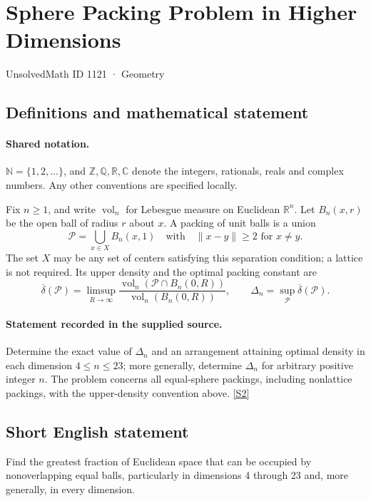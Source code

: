 \documentclass[11pt]{article}
\newcommand{\sref}[2]{\hyperlink{source:#1:#2}{[S#2]}}
\begin{document}
\setcounter{section}{1120}
\section{Sphere Packing Problem in Higher Dimensions}\label{1121}
{\small\sffamily UnsolvedMath ID 1121 · Geometry}
\subsection{Definitions and mathematical statement}

\paragraph{Shared notation.}$\mathbb N=\{1,2,\ldots\}$, and $\mathbb Z,\mathbb Q,\mathbb R,\mathbb C$ denote the integers, rationals, reals and complex numbers. Any other conventions are specified locally.


Fix \(n\ge1\), and write \(\operatorname{vol}_n\) for Lebesgue
measure on Euclidean \(\mathbb R^n\).  Let \(B_n(x,r)\) be the open ball
of radius \(r\) about \(x\).  A packing of unit balls is a union
\[
 \mathcal P=\bigcup_{x\in X}B_n(x,1)
 \quad\text{with}\quad \|x-y\|\ge2\text{ for }x\ne y.
\]
The set \(X\) may be any set of centers satisfying this separation
condition; a lattice is not required.  Its upper density and the
optimal packing constant are
\[
 \overline\delta(\mathcal P)
  =\limsup_{R\to\infty}
    \frac{\operatorname{vol}_n(\mathcal P\cap B_n(0,R))}
         {\operatorname{vol}_n(B_n(0,R))},
 \qquad
 \Delta_n=\sup_{\mathcal P}\overline\delta(\mathcal P).
\]
\paragraph{Statement recorded in the supplied source.}
Determine the exact value of \(\Delta_n\) and an arrangement attaining
optimal density in each dimension \(4\le n\le23\); more generally,
determine \(\Delta_n\) for arbitrary positive integer \(n\).
The problem concerns all equal-sphere packings, including nonlattice
packings, with the upper-density convention above. \sref{1121}{2}
\subsection{Short English statement}
Find the greatest fraction of Euclidean space that can be occupied by nonoverlapping equal balls, particularly in dimensions 4 through 23 and, more generally, in every dimension.
\end{document}
